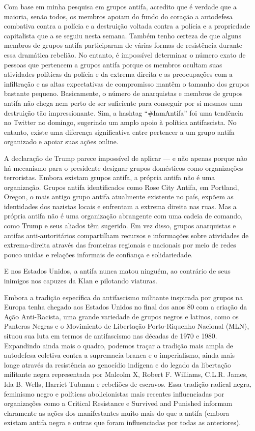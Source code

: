 Com base em minha pesquisa em grupos antifa, acredito que é verdade que a maioria, senão todos, os membros apoiam do fundo do coração a autodefesa combativa contra a polícia e a destruição voltada contra a polícia e a propriedade capitalista que a se seguiu nesta semana. Também tenho certeza de que alguns membros de grupos antifa participaram de várias formas de resistência durante essa dramática rebelião. No entanto, é impossível determinar o número exato de pessoas que pertencem a grupos antifa porque os membros ocultam suas atividades políticas da polícia e da extrema direita e as preocupações com a infiltração e as altas expectativas de compromisso mantêm o tamanho dos grupos bastante pequeno. Basicamente, o número de anarquistas e membros de grupos antifa não chega nem perto de ser suficiente para conseguir por si mesmos uma destruição tão impressionante. Sim, a hashtag “\#IamAntifa” foi uma tendência no Twitter no domingo, sugerindo um amplo apoio à política antifascista. No entanto, existe uma diferença significativa entre pertencer a um grupo antifa organizado e apoiar suas ações online.

A declaração de Trump parece impossível de aplicar — e não apenas porque não há mecanismo para o presidente designar grupos domésticos como organizações terroristas. Embora existam grupos antifa, a própria antifa não é uma organização. Grupos antifa identificados como Rose City Antifa, em Portland, Oregon, o mais antigo grupo antifa atualmente existente no país, expõem as identidades dos nazistas locais e enfrentam a extrema direita nas ruas. Mas a própria antifa não é uma organização abrangente com uma cadeia de comando, como Trump e seus aliados têm sugerido. Em vez disso, grupos anarquistas e antifas anti-autoritários compartilham recursos e informações sobre atividades de extrema-direita através das fronteiras regionais e nacionais por meio de redes pouco unidas e relações informais de confiança e solidariedade.
 
E nos Estados Unidos, a antifa nunca matou ninguém, ao contrário de seus inimigos nos capuzes da Klan e pilotando viaturas.

Embora a tradição específica do antifascismo militante inspirada por grupos na Europa tenha chegado aos Estados Unidos no final dos anos 80 com a criação da Ação Anti-Racista, uma grande variedade de grupos negros e latinos, como os Panteras Negras e o Movimiento de Libertação Porto-Riquenho Nacional (MLN), situou sua luta em termos de antifascismo nas décadas de 1970 e 1980. Expandindo ainda mais o quadro, podemos traçar a tradição mais ampla de autodefesa coletiva contra a supremacia branca e o imperialismo, ainda mais longe através da resistência ao genocídio indígena e do legado da libertação militante negra representada por Malcolm X, Robert F. Williams, C.L.R. James, Ida B. Wells, Harriet Tubman e rebeliões de escravos. Essa tradição radical negra, feminismo negro e políticas abolicionistas mais recentes influenciadas por organizações como a Critical Resistance e Survived and Punished informam claramente as ações dos manifestantes muito mais do que a antifa (embora existam antifa negra e outras que foram influenciadas por todas as anteriores).
 
